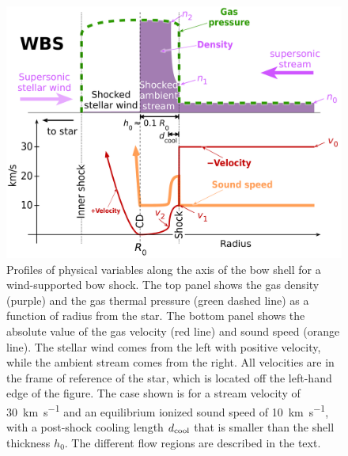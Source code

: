 \begin{figure}
  \centering
  \includegraphics[width=\linewidth]{figs/shell-profile-wbs}
  \caption{Profiles of physical variables along the axis of the bow
    shell for a wind-supported bow shock.  The top panel shows the gas
    density (purple) and the gas thermal pressure (green dashed line)
    as a function of radius from the star. The bottom panel shows the
    absolute value of the gas velocity (red line) and sound speed
    (orange line).  The stellar wind comes from the left with positive
    velocity, while the ambient stream comes from the right. All
    velocities are in the frame of reference of the star, which is
    located off the left-hand edge of the figure.  The case shown is
    for a stream velocity of \SI{30}{km.s^{-1}} and an equilibrium
    ionized sound speed of \SI{10}{km.s^{-1}}, with a post-shock
    cooling length \(d_{\text{cool}}\) that is smaller than the shell thickness
    \(h_0\). The different flow regions are described in the text.}
  \label{fig:axial-structure-wbs}
\end{figure}
